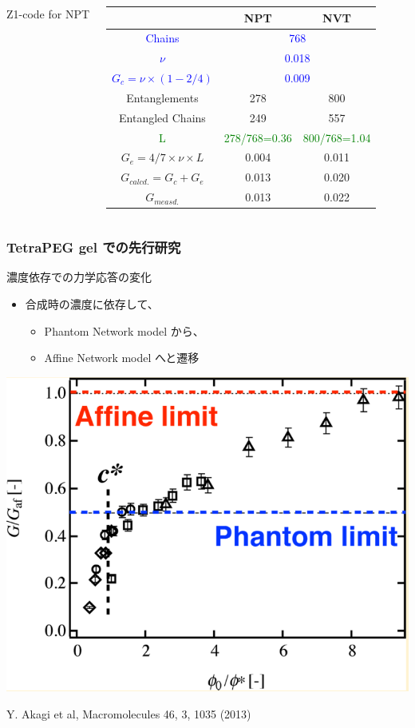 \documentclass[12pt, dvipdfmx]{beamer}
\begin{document}
\begin{frame}
\begin{columns}[c, onlytextwidth]
\begin{center}
					\scriptsize
					Z1-code for NPT
				\end{center}
				\scriptsize
				\begin{center}
					\begin{tabular}{c|c|c} \hline
						&NPT & NVT \\ \hline \hline
						\textcolor{blue}{Chains} & \multicolumn{2}{|c}{\textcolor{blue}{768}}\\ \hline
						\textcolor{blue}{$\nu$}& \multicolumn{2}{|c}{\textcolor{blue}{0.018}}\\ \hline
						\textcolor{blue}{$G_c = \nu \times (1-2/4)$}&\multicolumn{2}{|c}{\textcolor{blue}{0.009}} \\ \hline \hline
						Entanglements& 278& 800\\ \hline
						Entangled Chains&249&557 \\ \hline
						\textcolor{green}{L} & \textcolor{green}{278/768=0.36} & \textcolor{green}{800/768=1.04} \\ \hline
						$G_e=4/7 \times \nu \times L $ & 0.004 & 0.011 \\ \hline \hline
						\alert{$G_{calcd.}=G_c + G_e$} & \alert{0.013} & \alert{0.020} \\ \hline \hline
						$G_{measd.}$ & 0.013 & 0.022 \\ \hline
					\end{tabular}
				\end{center}
		\end{columns}
\end{frame}

\begin{frame}
    \frametitle{TetraPEG gel での先行研究}
	\vspace{-2mm}
	\begin{exampleblock}{濃度依存での力学応答の変化}
		\begin{itemize}
			\item 合成時の濃度に依存して、
			\begin{itemize}
				\item Phantom Network model から、
				\item Affine Network model へと遷移
			\end{itemize}
		\end{itemize}
		\begin{center}
			\includegraphics[width=.5\textwidth]{sakai_affine_phantom.png}

			Y. Akagi et al, Macromolecules 46, 3, 1035 (2013)
		\end{center}
	\end{exampleblock}
\end{frame}
\end{document}
